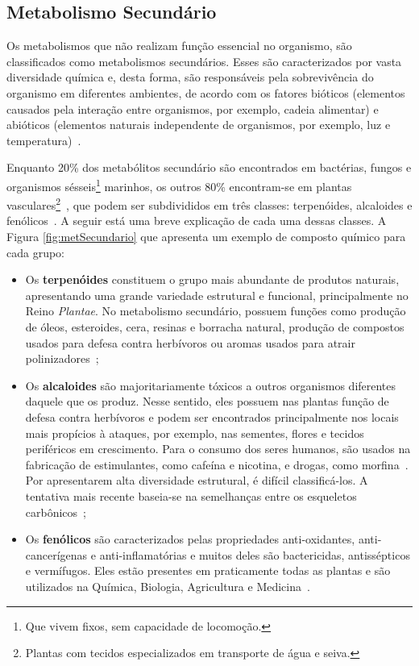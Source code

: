 \subsection{Metabolismo Secundário}

\indent Os metabolismos que não realizam função essencial no organismo, são classificados como metabolismos secundários. Esses são caracterizados por vasta diversidade química e, desta forma, são responsáveis pela sobrevivência do organismo em diferentes ambientes, de acordo com os fatores bióticos (elementos causados pela interação entre organismos, por exemplo, cadeia alimentar) e abióticos (elementos naturais independente de organismos, por exemplo, luz e temperatura)~\cite{Cap3schomburg}.

\indent Enquanto 20\% dos metabólitos secundário são encontrados em bactérias, fungos e organismos sésseis\footnote{Que vivem fixos, sem capacidade de locomoção.} marinhos, os outros 80\% encontram-se em plantas vasculares\footnote{Plantas com tecidos especializados em transporte de água e seiva.}~\cite{Cap3schomburg}, que podem ser subdivididos em três classes: terpenóides, alcaloides e fenólicos~\cite{kabera14}. A seguir está uma breve explicação de cada uma dessas classes. A Figura \ref{fig:metSecundario} que apresenta um exemplo de composto químico para cada grupo:

\begin{itemize}
\item Os \textbf{terpenóides} constituem o grupo mais abundante de produtos naturais, apresentando uma grande variedade estrutural e funcional, principalmente no Reino \textit{Plantae}. No metabolismo secundário, possuem funções como produção de óleos, esteroides, cera, resinas e borracha natural, produção de compostos usados para defesa contra herbívoros ou aromas usados para atrair polinizadores~\cite{Cap3schomburg};

\item Os \textbf{alcaloides} são majoritariamente tóxicos a outros organismos diferentes daquele que os produz. Nesse sentido, eles possuem nas plantas função de defesa contra herbívoros e podem ser encontrados principalmente nos locais mais propícios à ataques, por exemplo, nas sementes, flores e tecidos periféricos em crescimento. Para o consumo dos seres humanos, são usados na fabricação de estimulantes, como cafeína e nicotina, e drogas, como morfina~\cite{Cap3schomburg}. Por apresentarem alta diversidade estrutural, é difícil classificá-los. A tentativa mais recente baseia-se na semelhanças entre os esqueletos carbônicos~\cite{kabera14};

\item Os \textbf{fenólicos} são caracterizados pelas propriedades anti-oxidantes, anti-cancerígenas e anti-inflamatórias e muitos deles são bactericidas, antissépticos e vermífugos. Eles estão presentes em praticamente todas as plantas e são utilizados na Química, Biologia, Agricultura e Medicina~\cite{kabera14}.
\end{itemize}

